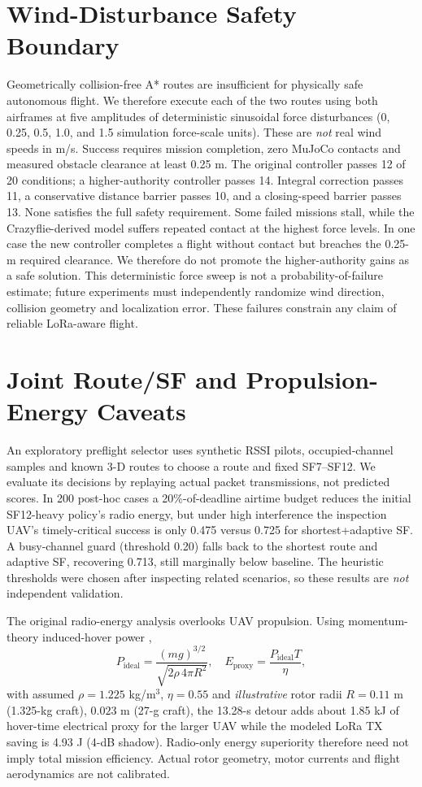 \documentclass[conference]{IEEEtran}
\begin{document}
\section{Wind-Disturbance Safety Boundary}
Geometrically collision-free A* routes are insufficient for physically safe autonomous flight. We therefore execute each of the two routes using both airframes at five amplitudes of deterministic sinusoidal force disturbances (0, 0.25, 0.5, 1.0, and 1.5 simulation force-scale units). These are \emph{not} real wind speeds in m/s. Success requires mission completion, zero MuJoCo contacts and measured obstacle clearance at least 0.25 m. The original controller passes 12 of 20 conditions; a higher-authority controller passes 14. Integral correction passes 11, a conservative distance barrier passes 10, and a closing-speed barrier passes 13. None satisfies the full safety requirement. Some failed missions stall, while the Crazyflie-derived model suffers repeated contact at the highest force levels. In one case the new controller completes a flight without contact but breaches the 0.25-m required clearance. We therefore do not promote the higher-authority gains as a safe solution. This deterministic force sweep is not a probability-of-failure estimate; future experiments must independently randomize wind direction, collision geometry and localization error. These failures constrain any claim of reliable LoRa-aware flight.

\section{Joint Route/SF and Propulsion-Energy Caveats}
An exploratory preflight selector uses synthetic RSSI pilots, occupied-channel samples and known 3-D routes to choose a route and fixed SF7--SF12. We evaluate its decisions by replaying actual packet transmissions, not predicted scores. In 200 post-hoc cases a 20\%-of-deadline airtime budget reduces the initial SF12-heavy policy's radio energy, but under high interference the inspection UAV's timely-critical success is only 0.475 versus 0.725 for shortest+adaptive SF. A busy-channel guard (threshold 0.20) falls back to the shortest route and adaptive SF, recovering 0.713, still marginally below baseline. The heuristic thresholds were chosen after inspecting related scenarios, so these results are \emph{not} independent validation.

The original radio-energy analysis overlooks UAV propulsion. Using momentum-theory induced-hover power \cite{hover},
\begin{equation}
P_{\mathrm{ideal}}=\frac{(mg)^{3/2}}{\sqrt{2\rho\,4\pi R^2}},\quad
E_{\mathrm{proxy}}=\frac{P_{\mathrm{ideal}}T}{\eta},
\end{equation}
with assumed $\rho=1.225$ kg/m$^3$, $\eta=0.55$ and \emph{illustrative} rotor radii $R=0.11$ m (1.325-kg craft), $0.023$ m (27-g craft), the 13.28-s detour adds about 1.85 kJ of hover-time electrical proxy for the larger UAV while the modeled LoRa TX saving is 4.93 J (4-dB shadow). Radio-only energy superiority therefore need not imply total mission efficiency. Actual rotor geometry, motor currents and flight aerodynamics are not calibrated.
\end{document}
